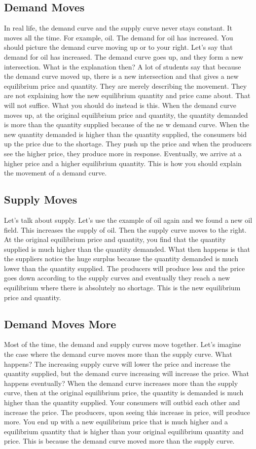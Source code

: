 \documentclass[DIV=classic,11pt,numbers=noenddot,listof=totoc,bibliography=totoc,parskip]{scrartcl}
\begin{document}
\subsection{Demand Moves}
In real life, the demand curve and the supply curve never stays constant. It moves all the time. For example, oil. The demand for oil has increased. You should picture the demand curve moving up or to your right. Let's say that demand for oil has increased. The demand curve goes up, and they form a new intersection. What is the explanation then? A lot of students say that because the demand curve moved up, there is a new intersection and that gives a new equilibrium price and quantity. They are merely describing the movement. They are not explaining how the new equilibrium quantity and price came about. That will not suffice. What you should do instead is this. When the demand curve moves up, at the original equilibrium price and quantity, the quantity demanded is more than the quantity supplied because of the ne w demand curve. When the new quantity demanded is higher than the quantity supplied, the consumers bid up the price due to the shortage. They push up the price and when the producers see the higher price, they produce more in response. Eventually, we arrive at a higher price and a higher equilibrium quantity. This is how you should explain the movement of a demand curve.
\subsection{Supply Moves}
Let's talk about supply. Let's use the example of oil again and we found a new oil field. This increases the supply of oil. Then the supply curve moves to the right. At the original equilibrium price and quantity, you find that the quantity supplied is much higher than the quantity demanded. What then happens is that the suppliers notice the huge surplus because the quantity demanded is much lower than the quantity supplied. The producers will produce less and the price goes down according to the supply curves and eventually they reach a new equilibrium where there is absolutely no shortage. This is the new equilibrium price and quantity.
\subsection{Demand Moves More}
Most of the time, the demand and supply curves move together. Let's imagine the case where the demand curve moves more than the supply curve. What happens? The increasing supply curve will lower the price and increase the quantity supplied, but the demand curve increasing will increase the price. What happens eventually? When the demand curve increases more than the supply curve, then at the original equilibrium price, the quantity is demanded is much higher than the quantity supplied. Your consumers will outbid each other and increase the price. The producers, upon seeing this increase in price, will produce more. You end up with a new equilibrium price that is much higher and a equilibrium quantity that is higher than your original equilibrium quantity and price. This is because the demand curve moved more than the supply curve.
\end{document}
